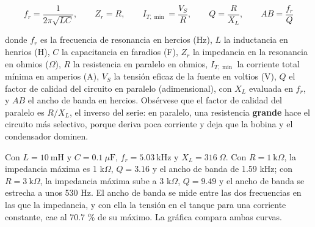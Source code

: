 \documentclass[11pt,letterpaper]{article}
\begin{document}
\begin{equation}
  f_r = \frac{1}{2\pi\sqrt{LC}}, \qquad Z_r = R, \qquad I_{T,\min} = \frac{V_S}{R}, \qquad Q = \frac{R}{X_L}, \qquad AB = \frac{f_r}{Q}
\end{equation}

donde $f_r$ es la frecuencia de resonancia en hercios (Hz), $L$ la inductancia en henrios (H), $C$ la capacitancia en faradios (F), $Z_r$ la impedancia en la resonancia en ohmios (\ensuremath{\Omega}), $R$ la resistencia en paralelo en ohmios, $I_{T,\min}$ la corriente total mínima en amperios (A), $V_S$ la tensión eficaz de la fuente en voltios (V), $Q$ el factor de calidad del circuito en paralelo (adimensional), con $X_L$ evaluada en $f_r$, y $AB$ el ancho de banda en hercios. Obsérvese que el factor de calidad del paralelo es $R/X_L$, el inverso del serie: en paralelo, una resistencia \textbf{grande} hace el circuito más selectivo, porque deriva poca corriente y deja que la bobina y el condensador dominen.

Con $L = 10\ \text{mH}$ y $C = 0.1\ \mu\text{F}$, $f_r = 5.03\ \text{kHz}$ y $X_L = 316\ \Omega$. Con $R = 1\ \text{k}\Omega$, la impedancia máxima es 1 k\ensuremath{\Omega}, $Q = 3.16$ y el ancho de banda de 1.59 kHz; con $R = 3\ \text{k}\Omega$, la impedancia máxima sube a 3 k\ensuremath{\Omega}, $Q = 9.49$ y el ancho de banda se estrecha a unos 530 Hz. El ancho de banda se mide entre las dos frecuencias en las que la impedancia, y con ella la tensión en el tanque para una corriente constante, cae al 70.7 \% de su máximo. La gráfica compara ambas curvas.
\end{document}
